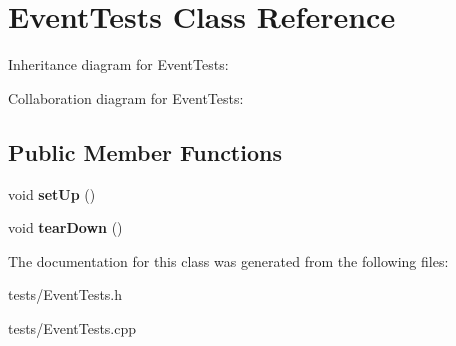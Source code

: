 \hypertarget{classEventTests}{}\section{Event\+Tests Class Reference}
\label{classEventTests}


Inheritance diagram for Event\+Tests\+:


Collaboration diagram for Event\+Tests\+:
\subsection*{Public Member Functions}
\begin{DoxyCompactItemize}
\item 
void {\bfseries set\+Up} ()\hypertarget{classEventTests_adb2de79b35837655ac218ae2d64b01d7}{}\label{classEventTests_adb2de79b35837655ac218ae2d64b01d7}

\item 
void {\bfseries tear\+Down} ()\hypertarget{classEventTests_af853647936d977993fbf573740cadee0}{}\label{classEventTests_af853647936d977993fbf573740cadee0}

\end{DoxyCompactItemize}


The documentation for this class was generated from the following files\+:\begin{DoxyCompactItemize}
\item 
tests/Event\+Tests.\+h\item 
tests/Event\+Tests.\+cpp\end{DoxyCompactItemize}
